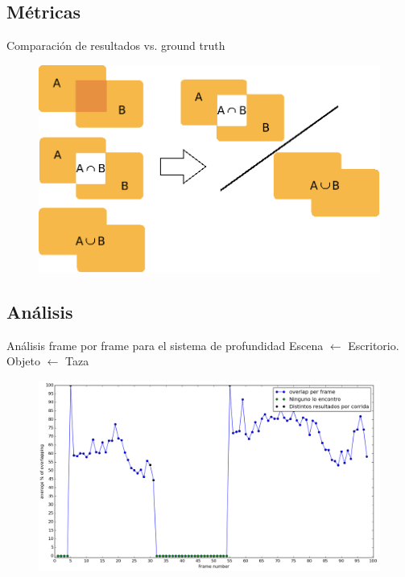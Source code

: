 \documentclass[]{beamer}
\begin{document}
\subsection{Métricas}
\begin{frame}[t]{Comparación de resultados vs. ground truth}
    \begin{figure}[t]
        \centering
        \includegraphics[scale=0.35]{img/pascal/pascal.png}
    \end{figure}
\end{frame}



\subsection{Análisis}
\begin{frame}{Análisis frame por frame para el sistema de profundidad}
    Escena $\leftarrow$ Escritorio. Objeto $\leftarrow$ Taza
    \vspace*{-15pt}
    \begin{figure}
        \centering
        \includegraphics[scale=0.24]{img/frame_a_frame_depth-taza.png}
    \end{figure}

\end{frame}
\end{document}
